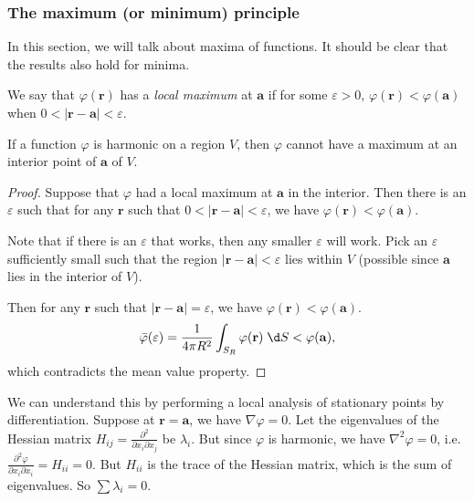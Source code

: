 \documentclass[a4paper]{article}
\begin{document}
\subsubsection{The maximum (or minimum) principle}
In this section, we will talk about maxima of functions. It should be clear that the results also hold for minima.

\begin{defi}
  We say that $\varphi(\mathbf{r})$ has a \emph{local maximum} at $\mathbf{a}$ if for some $\varepsilon > 0$, $\varphi(\mathbf{r}) < \varphi(\mathbf{a})$ when $0 < |\mathbf{r} - \mathbf{a}| < \varepsilon$.
\end{defi}

\begin{prop}
  If a function $\varphi$ is harmonic on a region $V$, then $\varphi$ cannot have a maximum at an interior point of $\mathbf{a}$ of $V$.
\end{prop}

\begin{proof}
  Suppose that $\varphi$ had a local maximum at $\mathbf{a}$ in the interior. Then there is an $\varepsilon$ such that for any $\mathbf{r}$ such that $0 < |\mathbf{r} - \mathbf{a}| < \varepsilon$, we have $\varphi(\mathbf{r}) < \varphi (\mathbf{a})$.

  Note that if there is an $\varepsilon$ that works, then any smaller $\varepsilon$ will work. Pick an $\varepsilon$ sufficiently small such that the region $|\mathbf{r} - \mathbf{a}| < \varepsilon$ lies within $V$ (possible since $\mathbf{a}$ lies in the interior of $V$).

  Then for any $\mathbf{r}$ such that $|\mathbf{r} - \mathbf{a}| = \varepsilon$, we have $\varphi(\mathbf{r}) < \varphi(\mathbf{a})$.
  \[
    \bar\varphi (\varepsilon) = \frac{1}{4\pi R^2}\int_{S_R}\varphi(\mathbf{r})\;\d S < \varphi(\mathbf{a}),
  \]
  which contradicts the mean value property.
\end{proof}

We can understand this by performing a local analysis of stationary points by differentiation. Suppose at $\mathbf{r} = \mathbf{a}$, we have $\nabla\varphi = 0$. Let the eigenvalues of the Hessian matrix $H_{ij} = \frac{\partial^2}{\partial x_i \partial x_j}$ be $\lambda_i$. But since $\varphi$ is harmonic, we have $\nabla^2 \varphi = 0$, i.e. $\frac{\partial^2\varphi}{\partial x_i\partial x_i} = H_{ii} = 0$. But $H_{ii}$ is the trace of the Hessian matrix, which is the sum of eigenvalues. So $\sum \lambda_i = 0$.
\end{document}
